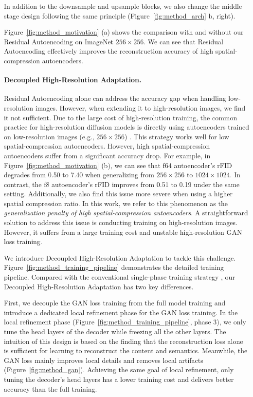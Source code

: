 In addition to the downsample and upsample blocks, we also change the middle stage design following the same principle (Figure~\ref{fig:method_arch} b, right). 

Figure~\ref{fig:method_motivation} (a) shows the comparison with and without our Residual Autoencoding on ImageNet $256 \times 256$. We can see that Residual Autoencoding effectively improves the reconstruction accuracy of high spatial-compression autoencoders. 




\paragraph{Decoupled High-Resolution Adaptation.} Residual Autoencoding alone can address the accuracy gap when handling low-resolution images. However, when extending it to high-resolution images, we find it not sufficient. Due to the large cost of high-resolution training, the common practice for high-resolution diffusion models is directly using autoencoders trained on low-resolution images (e.g., $256\times256$) \citep{chenpixart,chen2024pixart}. This strategy works well for low spatial-compression autoencoders. However, high spatial-compression autoencoders suffer from a significant accuracy drop. For example, in Figure~\ref{fig:method_motivation} (b), we can see that f64 autoencoder's rFID degrades from 0.50 to 7.40 when generalizing from $256\times256$ to $1024\times1024$. In contrast, the f8 autoencoder's rFID improves from 0.51 to 0.19 under the same setting. Additionally, we also find this issue more severe when using a higher spatial compression ratio. In this work, we refer to this phenomenon as the \emph{generalization penalty of high spatial-compression autoencoders}. A straightforward solution to address this issue is conducting training on high-resolution images. However, it suffers from a large training cost and unstable high-resolution GAN loss training. 

We introduce Decoupled High-Resolution Adaptation to tackle this challenge. Figure~\ref{fig:method_training_pipeline} demonstrates the detailed training pipeline. Compared with the conventional single-phase training strategy \citep{rombach2022high}, our Decoupled High-Resolution Adaptation has two key differences. 

First, we decouple the GAN loss training from the full model training and introduce a dedicated local refinement phase for the GAN loss training. In the local refinement phase (Figure~\ref{fig:method_training_pipeline}, phase 3), we only tune the head layers of the decoder while freezing all the other layers. The intuition of this design is based on the finding that the reconstruction loss alone is sufficient for learning to reconstruct the content and semantics. Meanwhile, the GAN loss mainly improves local details and removes local artifacts (Figure~\ref{fig:method_gan}). Achieving the same goal of local refinement, only tuning the decoder's head layers has a lower training cost and delivers better accuracy than the full training. 

